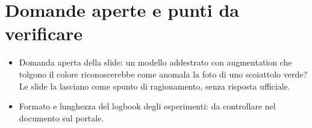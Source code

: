 \section{Domande aperte e punti da verificare}
\begin{verifica}
\begin{itemize}
  \item Domanda aperta della slide: un modello addestrato con augmentation che tolgono il colore
    riconoscerebbe come anomala la foto di uno scoiattolo verde? Le slide la lasciano come spunto di
    ragionamento, senza risposta ufficiale.
  \item Formato e lunghezza del logbook degli esperimenti: da controllare nel documento sul portale.
\end{itemize}
\end{verifica}
